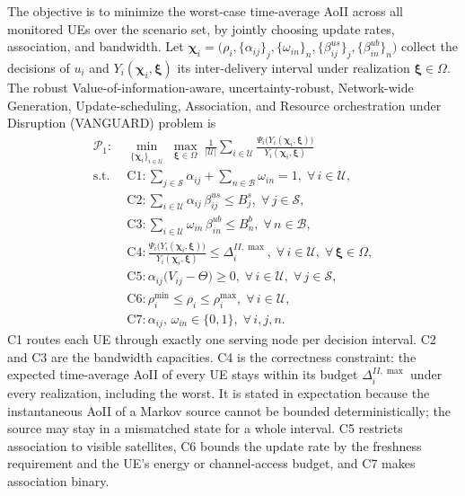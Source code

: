 The objective is to minimize the worst-case time-average AoII across all monitored UEs over the scenario set, by
jointly choosing update rates, association, and bandwidth. Let $\boldsymbol{\chi}_i=\bigl(\rho_i,\{\alpha_{ij}\}_{j},
\{\omega_{in}\}_{n},\{\beta^{us}_{ij}\}_{j},\{\beta^{ub}_{in}\}_{n}\bigr)$ collect the decisions of $u_i$ and
$Y_i(\boldsymbol{\chi}_i,\boldsymbol{\xi})$ its inter-delivery interval under realization $\boldsymbol{\xi}\in\Omega$.
The robust Value-of-information-aware, uncertainty-robust, Network-wide Generation, Update-scheduling, Association,
and Resource orchestration under Disruption (VANGUARD) problem is
\begin{align}
    \mathscr{P}_{1}:\;&\min_{\{\boldsymbol{\chi}_i\}_{i\in\mathscr{U}}}
    \;\max_{\boldsymbol{\xi}\in\Omega}
    \;\frac{1}{|\mathscr{U}|}\sum_{i\in\mathscr{U}}
    \frac{\Psi_{i}\bigl(Y_{i}(\boldsymbol{\chi}_i,\boldsymbol{\xi})\bigr)}
    {Y_{i}(\boldsymbol{\chi}_i,\boldsymbol{\xi})}
    \nonumber\\
    \text{s.t.}\;\;
    &\text{C1}:\sum_{j\in\mathscr{S}}\alpha_{ij}+\sum_{n\in\mathscr{B}}\omega_{in}=1,\;\forall\,i\in\mathscr{U},
    \nonumber\\
    &\text{C2}:\sum_{i\in\mathscr{U}}\alpha_{ij}\,\beta^{us}_{ij}\leq B^{s}_{j},\;\forall\,j\in\mathscr{S},
    \nonumber\\
    &\text{C3}:\sum_{i\in\mathscr{U}}\omega_{in}\,\beta^{ub}_{in}\leq B^{b}_{n},\;\forall\,n\in\mathscr{B},
    \nonumber\\
    &\text{C4}:\frac{\Psi_{i}\bigl(Y_{i}(\boldsymbol{\chi}_i,\boldsymbol{\xi})\bigr)}
    {Y_{i}(\boldsymbol{\chi}_i,\boldsymbol{\xi})}\leq\Delta_{i}^{II,\max},
    \;\forall\,i\in\mathscr{U},\;\forall\,\boldsymbol{\xi}\in\Omega,
    \nonumber\\
    &\text{C5}:\alpha_{ij}\bigl(V_{ij}-\Theta\bigr)\geq 0,\;\forall\,i\in\mathscr{U},\;\forall\,j\in\mathscr{S},
    \nonumber\\
    &\text{C6}:\rho_{i}^{\min}\leq\rho_{i}\leq\rho_{i}^{\max},\;\forall\,i\in\mathscr{U},
    \nonumber\\
    &\text{C7}:\alpha_{ij},\,\omega_{in}\in\{0,1\},\;\forall\,i,j,n.
    \nonumber
\end{align}
C1 routes each UE through exactly one serving node per decision interval. C2 and C3 are the bandwidth capacities. C4
is the correctness constraint: the expected time-average AoII of every UE stays within its budget
$\Delta_i^{II,\max}$ under every realization, including the worst. It is stated in expectation because the
instantaneous AoII of a Markov source cannot be bounded deterministically; the source may stay in a mismatched state
for a whole interval. C5 restricts association to visible satellites, C6 bounds the update rate by the freshness
requirement and the UE's energy or channel-access budget, and C7 makes association binary.

